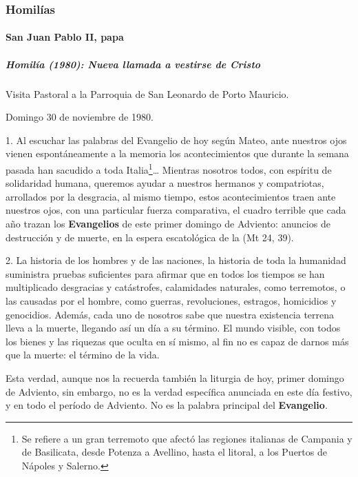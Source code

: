 \subsubsection{Homilías}\label{homiluxedas}

\paragraph{San Juan Pablo II, papa}\label{san-juan-pablo-ii-papa}

\subparagraph{Homilía (1980): Nueva llamada a vestirse de 	Cristo}\label{homiluxeda-nueva-llamada-a-vestirse-de-cristo}

Visita Pastoral a la Parroquia de San Leonardo de Porto Mauricio. 

Domingo 30 de noviembre de 1980.

1. Al escuchar las palabras del Evangelio de hoy según Mateo, ante nuestros ojos vienen espontáneamente a la memoria los acontecimientos que durante la semana pasada han sacudido a toda Italia\footnote{Se 	refiere a un gran terremoto que afectó las regiones italianas de 	Campania y de Basilicata, desde Potenza a Avellino, hasta el litoral, 	a los Puertos de Nápoles y Salerno.}\ldots{} Mientras nosotros todos, con espíritu de solidaridad humana, queremos ayudar a nuestros hermanos y compatriotas, arrollados por la desgracia, al mismo tiempo, estos acontecimientos traen ante nuestros ojos, con una particular fuerza comparativa, el cuadro terrible que cada año trazan los \textbf{Evangelios} de este primer domingo de Adviento: anuncios de destrucción y de muerte, en la espera escatológica de la  (Mt 24, 39).

2. La historia de los hombres y de las naciones, la historia de toda la humanidad suministra pruebas suficientes para afirmar que en todos los tiempos se han multiplicado desgracias y catástrofes, calamidades naturales, como terremotos, o las causadas por el hombre, como guerras, revoluciones, estragos, homicidios y genocidios. Además, cada uno de nosotros sabe que nuestra existencia terrena lleva a la muerte, llegando así un día a su término. El mundo visible, con todos los bienes y las riquezas que oculta en sí mismo, al fin no es capaz de darnos más que la muerte: el término de la vida.

Esta verdad, aunque nos la recuerda también la liturgia de hoy, primer domingo de Adviento, sin embargo, no es la verdad específica anunciada en este día festivo, y en todo el período de Adviento. No es la palabra principal del \textbf{Evangelio}.

